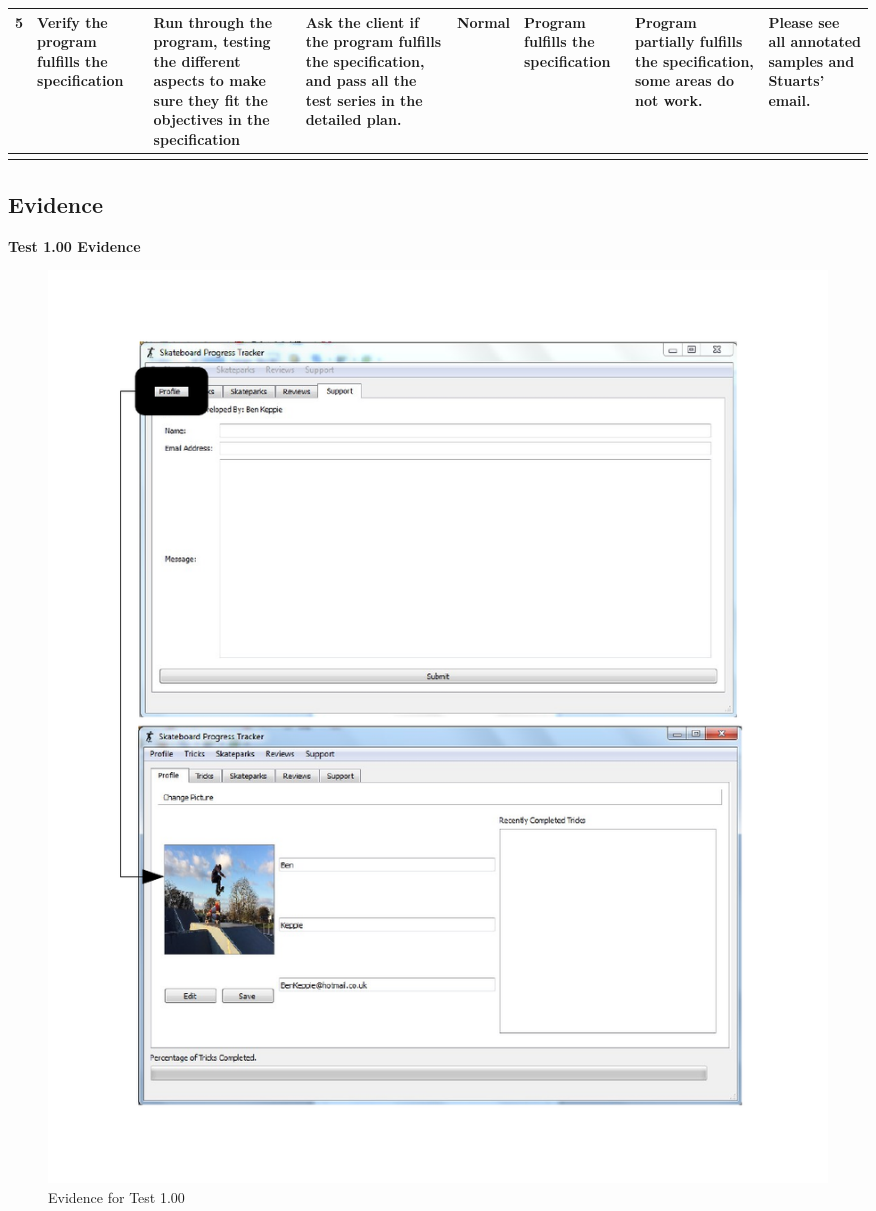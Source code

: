 \begin{landscape}
\begin{center}
\begin{longtable}{|p{1.5cm}|p{2.5cm}|p{2.5cm}|p{2cm}|p{2cm}|p{2cm}|p{2cm}|p{2cm}|}
5 & Verify the program fulfills the specification & Run through the program, testing the different aspects to make sure they fit the objectives in the specification & Ask the client if the program fulfills the specification, and pass all the test series in the detailed plan. & Normal & Program fulfills the specification & \textbf{Program partially fulfills the specification, some areas do not work.} & Please see all annotated samples and Stuarts' email. \\ \hline

\label{tab:Testing}

	\end{longtable}

\end{center}
\end{landscape}


\subsection{Evidence} %

\textbf{Test 1.00 Evidence}

\begin{figure}[H]
    \includegraphics[width=\textwidth]{./Testing/AnnotatedSamples/Test100.pdf}
    \caption{Evidence for Test 1.00} \label{fig:Test 1.00}
\end{figure}

